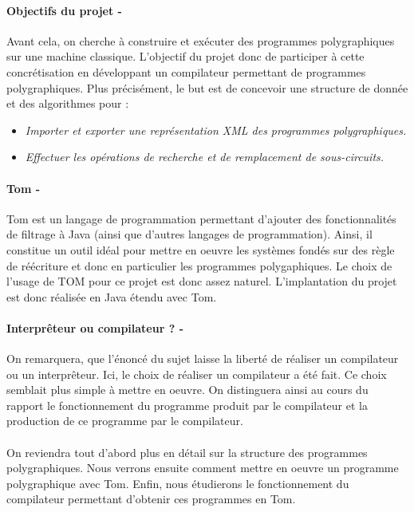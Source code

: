 \documentclass[a4paper,11pt,titlepage]{article}
\begin{document}
\paragraph{Objectifs du projet -} 
Avant cela, on cherche \`{a} construire et ex\'{e}cuter des programmes polygraphiques sur une machine classique. L'objectif du projet donc de participer \`{a} cette concr\'{e}tisation en d\'{e}veloppant un compilateur permettant de programmes polygraphiques. Plus pr\'{e}cis\'{e}ment, le but est de concevoir une structure de donn\'{e}e et des algorithmes pour :
\begin{itemize}
\item \textit{Importer et exporter une repr\'{e}sentation XML des programmes polygraphiques. }
\item \textit{Effectuer les op\'{e}rations de recherche et de remplacement de sous-circuits.}\\
\end {itemize}
\paragraph{Tom -}
Tom est un langage de programmation permettant d'ajouter des fonctionnalit\'{e}s de filtrage \`{a} Java (ainsi que d'autres langages de programmation). Ainsi, il constitue un outil id\'{e}al pour mettre en oeuvre les syst\`{e}mes fond\'{e}s sur des r\`{e}gle de r\'{e}\'{e}criture et donc en particulier les programmes polygaphiques. Le choix de l'usage de TOM pour ce projet est donc assez naturel. L'implantation du projet est donc r\'{e}alis\'{e}e en Java \'{e}tendu avec Tom.
\paragraph{Interpr\^{e}teur ou compilateur ? -}
On remarquera, que l'\'{e}nonc\'{e} du sujet laisse la libert\'{e} de r\'{e}aliser un compilateur ou un interpr\^{e}teur. Ici, le choix de r\'{e}aliser un compilateur a \'{e}t\'{e} fait. Ce choix semblait plus simple \`{a} mettre en oeuvre. On distinguera ainsi au cours du rapport le fonctionnement du programme produit par le compilateur et la production de ce programme par le compilateur.
\\\\\indent On reviendra tout d'abord plus en d\'{e}tail sur la structure des programmes polygraphiques. Nous verrons ensuite comment mettre en oeuvre un programme polygraphique avec Tom. Enfin, nous \'{e}tudierons le fonctionnement du compilateur permettant d'obtenir ces programmes en Tom.
\end{document}
